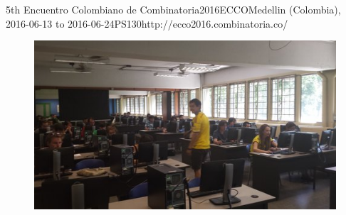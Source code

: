 \begin{event}{5th Encuentro Colombiano de Combinatoria}{2016ECCO}{Medellin (Colombia), 2016-06-13 to 2016-06-24}{PS}{130}{http://ecco2016.combinatoria.co/}
\begin{figure}[ht]
\includegraphics[scale=0.5]{pictures/ECCO-2.jpg}
\end{figure}



\end{event}
